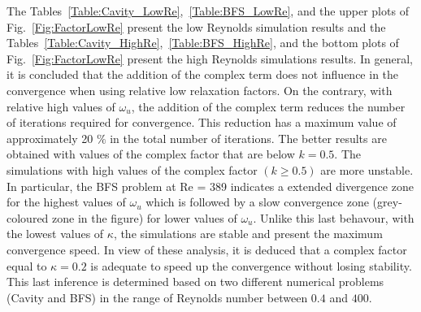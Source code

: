 \documentclass[final,3p,times,11pt,onecolumn]{myElsarticle}
\numberwithin{equation}{section}
\begin{document}
The Tables~\ref{Table:Cavity_LowRe},~\ref{Table:BFS_LowRe}, and the upper plots of Fig.~\ref{Fig:FactorLowRe} present the low Reynolds simulation results  and the Tables~\ref{Table:Cavity_HighRe},~\ref{Table:BFS_HighRe}, and the bottom plots of Fig.~\ref{Fig:FactorLowRe} present the high Reynolds simulations results. In general, it is concluded that the addition of the complex term does not influence in the convergence when using relative low relaxation factors. On the contrary, with relative high values of $\omega_u$, the addition of the complex term reduces the number of iterations required for convergence. This reduction has a maximum value of approximately 20 $\%$ in the total number of iterations. The better results are obtained with values of the complex factor that are below $k = 0.5$. The simulations with high values of the complex factor $(k \geq 0.5)$ are more unstable. In particular, the BFS problem at Re = 389 indicates a extended divergence zone for the highest values of $\omega_u$ which is followed by a slow convergence zone (grey-coloured zone in the figure) for lower values of $\omega_u$. Unlike this last behavour, with the lowest values of $\kappa$, the simulations are stable and present the maximum convergence speed. In view of these analysis, it is deduced that a complex factor equal to $\kappa = 0.2$ is adequate to speed up the convergence without losing stability. This last inference is determined based on two different numerical problems (Cavity and BFS) in the range of Reynolds number between $0.4$ and $400$. 

 
\end{document}
